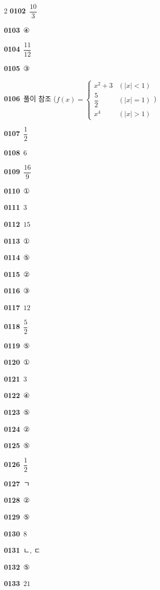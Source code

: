 \documentclass[10pt,a4paper]{article}
\begin{document}
\begin{multicols}{2}
\noindent\textbf{0102}\ $\dfrac{10}{3}$\par
\noindent\textbf{0103}\ ④\par
\noindent\textbf{0104}\ $\dfrac{11}{12}$\par
\noindent\textbf{0105}\ ③\par
\noindent\textbf{0106}\ 풀이 참조 ($f(x)=\begin{cases} x^2+3 & (|x|<1) \\[1ex] \dfrac{5}{2} & (|x|=1) \\[1ex] x^4 & (|x|>1) \end{cases}$)\par
\noindent\textbf{0107}\ $\dfrac{1}{2}$\par
\noindent\textbf{0108}\ $6$\par
\noindent\textbf{0109}\ $\dfrac{16}{9}$\par
\noindent\textbf{0110}\ ①\par
\noindent\textbf{0111}\ $3$\par
\noindent\textbf{0112}\ $15$\par
\noindent\textbf{0113}\ ①\par
\noindent\textbf{0114}\ ⑤\par
\noindent\textbf{0115}\ ②\par
\noindent\textbf{0116}\ ③\par
\noindent\textbf{0117}\ $12$\par
\noindent\textbf{0118}\ $\dfrac{5}{2}$\par
\noindent\textbf{0119}\ ⑤\par
\noindent\textbf{0120}\ ①\par
\noindent\textbf{0121}\ $3$\par
\noindent\textbf{0122}\ ④\par
\noindent\textbf{0123}\ ⑤\par
\noindent\textbf{0124}\ ②\par
\noindent\textbf{0125}\ ⑤\par
\noindent\textbf{0126}\ $\dfrac{1}{2}$\par
\noindent\textbf{0127}\ ㄱ\par
\noindent\textbf{0128}\ ②\par
\noindent\textbf{0129}\ ⑤\par
\noindent\textbf{0130}\ $8$\par
\noindent\textbf{0131}\ ㄴ, ㄷ\par
\noindent\textbf{0132}\ ⑤\par
\noindent\textbf{0133}\ $21$\par

\end{multicols}
\end{document}
